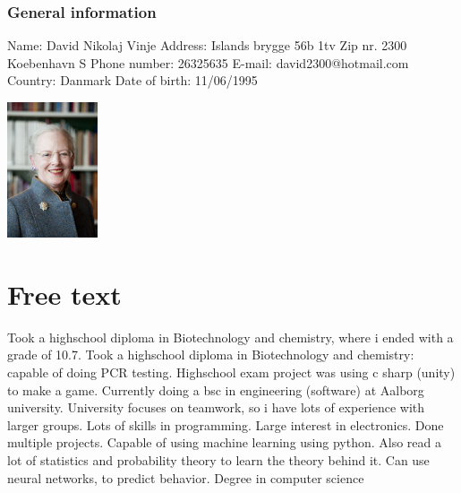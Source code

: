 \begin{center}
 \begin{minipage}[b]{0.45\textwidth} 
\subsubsection*{General information}
 Name: David Nikolaj Vinje \newline
 Address: Islands brygge 56b 1tv \newline
 Zip nr. 2300 Koebenhavn S \newline
 Phone number: 26325635 \newline
 E-mail: david2300@hotmail.com \newline
 Country: Danmark \newline
 Date of birth: 11/06/1995 
 \end{minipage}
 \hfill
\begin{minipage}[b]{3cm}
 \includegraphics[height=4cm]{figures/1200px-Drottning_Margrethe_av_Danmark}
 \end{minipage}
 \end{center}

\section*{Free text}
Took a highschool diploma in Biotechnology and chemistry, where i ended with a grade of 10.7.
Took a highschool diploma in Biotechnology and chemistry: capable of doing PCR testing.
Highschool exam project was using c sharp (unity) to make a game.
Currently doing a bsc in engineering (software) at Aalborg university.
University focuses on teamwork, so i have lots of experience with larger groups.
Lots of skills in programming.
Large interest in electronics. Done multiple projects.
Capable of using machine learning using python. Also read a lot of statistics and probability theory to learn the theory behind it. Can use neural networks, to predict behavior.
Degree in computer science

